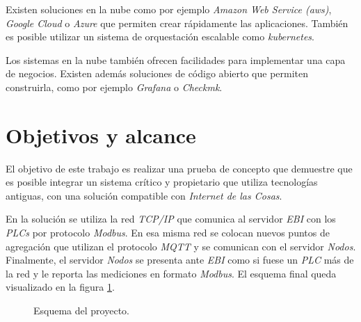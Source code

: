 		Existen soluciones en la nube como por ejemplo \emph{Amazon Web Service (aws)}, \emph{Google Cloud} o \emph{Azure} que permiten crear rápidamente las aplicaciones. También es posible utilizar un sistema de orquestación escalable como \emph{kubernetes}.
	
		Los sistemas en la nube también ofrecen facilidades para implementar una capa de negocios. Existen además soluciones de código abierto que permiten construirla, como por ejemplo \emph{Grafana} o \emph{Checkmk}.

\section{Objetivos y alcance}
\label{objetivos}
	
		El objetivo de este trabajo es realizar una prueba de concepto que demuestre que es posible integrar un sistema crítico y propietario que utiliza tecnologías antiguas, con una solución compatible con \emph{Internet de las Cosas}.
		
		En la solución se utiliza la red \emph{TCP/IP} que comunica al servidor \emph{EBI} con los \emph{PLCs} por protocolo \emph{Modbus}. En esa misma red se colocan nuevos puntos de agregación que utilizan el protocolo \emph{MQTT} y se comunican con el servidor \emph{Nodos}. Finalmente, el servidor \emph{Nodos} se presenta ante \emph{EBI} como si fuese un \emph{PLC} más de la red y le reporta las mediciones en formato \emph{Modbus}. El esquema final queda visualizado en la figura \ref{fig:esquemaProyecto}.
	
	\begin{figure}[h]
			\centering
			\caption{Esquema del proyecto.}
			\label{fig:esquemaProyecto}
		\end{figure}
	
